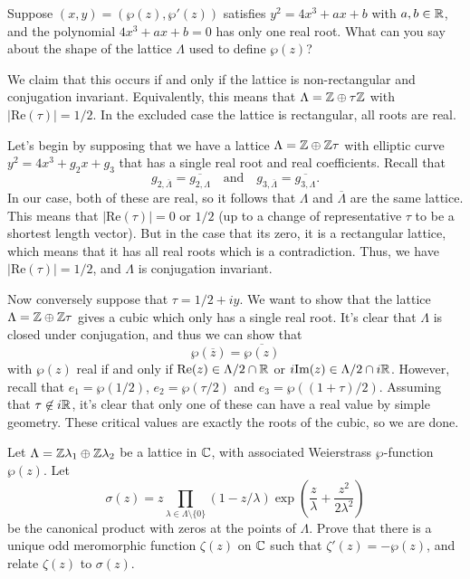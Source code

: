 \documentclass{pset}
\begin{document}
\begin{problem}{5.16}
  Suppose $(x,y) = (\wp(z), \wp'(z))$ satisfies $y^2=4x^3+ax+b$ with $a,b\in \mathbb{R}$, and the polynomial $4x^3 + ax+b=0$ has only one real root. What can you say about the shape of the lattice $\Lambda$ used to define $\wp(z)$?
\end{problem}

\begin{solution}
  We claim that this occurs if and only if the lattice is non-rectangular and conjugation invariant. Equivalently, this means that $\Lambda = \mathbb{Z}\oplus \tau \mathbb{Z}$ with $|\textrm{Re}(\tau)|=1/2$. In the excluded case the lattice is rectangular, all roots are real. 

  Let's begin by supposing that we have a lattice $\Lambda = \mathbb{Z}\oplus \mathbb{Z}\tau$ with elliptic curve $y^2 = 4x^3 + g_2x+g_3$ that has a single real root and real coefficients. Recall that 
  \[g_{2, \overline{\Lambda}} = \overline{g_{2,\Lambda}}\quad\textrm{and}\quad g_{3, \overline{\Lambda}} = \overline{g_{3,\Lambda}}.\]
  In our case, both of these are real, so it follows that $\Lambda$ and $\overline{\Lambda}$ are the same lattice. This means that $|\textrm{Re}(\tau)| = 0$ or $1/2$ (up to a change of representative $\tau$ to be a shortest length vector). But in the case that its zero, it is a rectangular lattice, which means that it has all real roots which is a contradiction. Thus, we have $|\textrm{Re}(\tau)|=1/2$, and $\Lambda$ is conjugation invariant.

  Now conversely suppose that $\tau = 1/2 + iy$. We want to show that the lattice $\Lambda= \mathbb{Z}\oplus \mathbb{Z}\tau$ gives a cubic which only has a single real root. It's clear that $\Lambda$ is closed under conjugation, and thus we can show that 
  \[
    \wp(\overline{z}) = \overline{\wp(z)}
  \]
  with $\wp(z)$ real if and only if $\textrm{Re}(z) \in \Lambda/2\cap \mathbb{R}$ or $i\textrm{Im}(z)\in\Lambda/2 \cap i\mathbb{R}$. However, recall that $e_1 = \wp(1/2)$, $e_2=\wp(\tau/2)$ and $e_3=\wp((1+\tau)/2)$. Assuming that $\tau\not\in i\mathbb{R}$, it's clear that only one of these can have a real value by simple geometry. These critical values are exactly the roots of the cubic, so we are done.
\end{solution}

\begin{problem}{5.18}
  Let $\Lambda = \mathbb{Z} \lambda_1 \oplus \mathbb{Z} \lambda_2$ be a lattice in $\mathbb{C}$, with associated Weierstrass $\wp$-function $\wp(z)$. Let
  \[
    \sigma(z) = z\prod_{\lambda\in \Lambda\setminus\{0\}} (1-z/\lambda) \exp\left(\frac{z}{\lambda} + \frac{z^2}{2\lambda^2}\right)
  \]
  be the canonical product with zeros at the points of $\Lambda$. Prove that there is a unique odd meromorphic function $\zeta(z)$ on $\mathbb{C}$ such that $\zeta'(z) = -\wp(z)$, and relate $\zeta(z)$ to $\sigma(z)$.
\end{problem}
\end{document}
